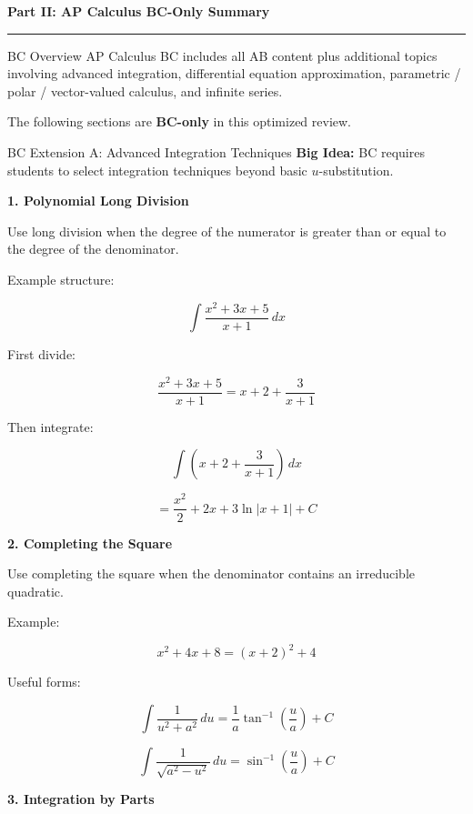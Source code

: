 \documentclass[11pt]{article}
\newcommand{\sectiontitle}[1]{
\vspace{0.8em}
{\Large\textcolor{novelPurpleDark}{\textbf{#1}}}
\vspace{0.35em}
\hrule
\vspace{0.8em}
}
\newcommand{\subtopic}[1]{
\vspace{0.45em}
\textcolor{novelPurpleDark}{\textbf{#1}}
}
\begin{document}
\newpage


\sectiontitle{Part II: AP Calculus BC-Only Summary}

\begin{unitbox}{BC Overview}
AP Calculus BC includes all AB content plus additional topics involving advanced integration, differential equation approximation, parametric / polar / vector-valued calculus, and infinite series.

\medskip

The following sections are \textbf{BC-only} in this optimized review.
\end{unitbox}

\begin{unitbox}{BC Extension A: Advanced Integration Techniques}
\textbf{Big Idea:} BC requires students to select integration techniques beyond basic \(u\)-substitution.
\end{unitbox}

\subtopic{1. Polynomial Long Division}

Use long division when the degree of the numerator is greater than or equal to the degree of the denominator.

Example structure:

\[
\int \frac{x^2+3x+5}{x+1}\,dx
\]

First divide:

\[
\frac{x^2+3x+5}{x+1}=x+2+\frac{3}{x+1}
\]

Then integrate:

\[
\int \left(x+2+\frac{3}{x+1}\right)\,dx
\]

\[
=\frac{x^2}{2}+2x+3\ln|x+1|+C
\]

\subtopic{2. Completing the Square}

Use completing the square when the denominator contains an irreducible quadratic.

Example:

\[
x^2+4x+8=(x+2)^2+4
\]

Useful forms:

\[
\int \frac{1}{u^2+a^2}\,du=\frac1a\tan^{-1}\left(\frac{u}{a}\right)+C
\]

\[
\int \frac{1}{\sqrt{a^2-u^2}}\,du=\sin^{-1}\left(\frac{u}{a}\right)+C
\]

\subtopic{3. Integration by Parts}
\end{document}
